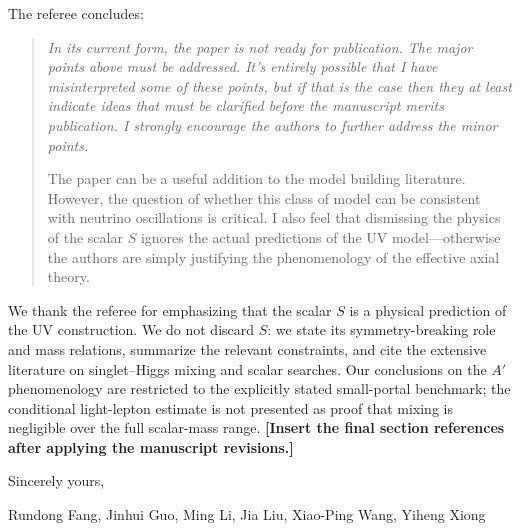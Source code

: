 \documentclass[12pt,a4paper]{article}
\begin{document}
The referee concludes:

\begin{quote}
\itshape
In its current form, the paper is not ready for publication. The major points above must be addressed. It's entirely possible that I have misinterpreted some of these points, but if that is the case then they at least indicate ideas that must be clarified before the manuscript merits publication. I strongly encourage the authors to further address the minor points.

The paper can be a useful addition to the model building literature. However, the question of whether this class of model can be consistent with neutrino oscillations is critical. I also feel that dismissing the physics of the scalar \(S\) ignores the actual predictions of the UV model---otherwise the authors are simply justifying the phenomenology of the effective axial theory.
\end{quote}

We thank the referee for emphasizing that the scalar \(S\) is a physical prediction of the UV construction. We do not discard \(S\): we state its symmetry-breaking role and mass relations, summarize the relevant constraints, and cite the extensive literature on singlet--Higgs mixing and scalar searches. Our conclusions on the \(A'\) phenomenology are restricted to the explicitly stated small-portal benchmark; the conditional light-lepton estimate is not presented as proof that mixing is negligible over the full scalar-mass range. \textbf{[Insert the final section references after applying the manuscript revisions.]}

\medskip

\noindent Sincerely yours,

\noindent Rundong Fang, Jinhui Guo, Ming Li, Jia Liu, Xiao-Ping Wang, Yiheng Xiong



\end{document}
